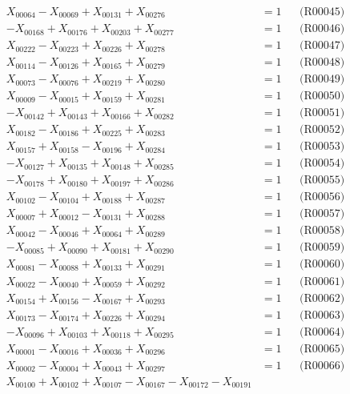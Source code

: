 \documentclass[a4paper,10pt]{article}
\begin{document}
{\begin{align}
X_{00064} - X_{00069} + X_{00131} + X_{00276} &= 1 && \text{(R00045)} \\
-X_{00168} + X_{00176} + X_{00203} + X_{00277} &= 1 && \text{(R00046)} \\
X_{00222} - X_{00223} + X_{00226} + X_{00278} &= 1 && \text{(R00047)} \\
X_{00114} - X_{00126} + X_{00165} + X_{00279} &= 1 && \text{(R00048)} \\
X_{00073} - X_{00076} + X_{00219} + X_{00280} &= 1 && \text{(R00049)} \\
X_{00009} - X_{00015} + X_{00159} + X_{00281} &= 1 && \text{(R00050)} \\
-X_{00142} + X_{00143} + X_{00166} + X_{00282} &= 1 && \text{(R00051)} \\
X_{00182} - X_{00186} + X_{00225} + X_{00283} &= 1 && \text{(R00052)} \\
X_{00157} + X_{00158} - X_{00196} + X_{00284} &= 1 && \text{(R00053)} \\
-X_{00127} + X_{00135} + X_{00148} + X_{00285} &= 1 && \text{(R00054)} \\
-X_{00178} + X_{00180} + X_{00197} + X_{00286} &= 1 && \text{(R00055)} \\
X_{00102} - X_{00104} + X_{00188} + X_{00287} &= 1 && \text{(R00056)} \\
X_{00007} + X_{00012} - X_{00131} + X_{00288} &= 1 && \text{(R00057)} \\
X_{00042} - X_{00046} + X_{00064} + X_{00289} &= 1 && \text{(R00058)} \\
-X_{00085} + X_{00090} + X_{00181} + X_{00290} &= 1 && \text{(R00059)} \\
X_{00081} - X_{00088} + X_{00133} + X_{00291} &= 1 && \text{(R00060)} \\
\allowbreak
X_{00022} - X_{00040} + X_{00059} + X_{00292} &= 1 && \text{(R00061)} \\
X_{00154} + X_{00156} - X_{00167} + X_{00293} &= 1 && \text{(R00062)} \\
X_{00173} - X_{00174} + X_{00226} + X_{00294} &= 1 && \text{(R00063)} \\
-X_{00096} + X_{00103} + X_{00118} + X_{00295} &= 1 && \text{(R00064)} \\
X_{00001} - X_{00016} + X_{00036} + X_{00296} &= 1 && \text{(R00065)} \\
X_{00002} - X_{00004} + X_{00043} + X_{00297} &= 1 && \text{(R00066)} \\
X_{00100} + X_{00102} + X_{00107} - X_{00167} - X_{00172} - X_{00191} \\[0.5ex]

\end{align}}
\end{document}
